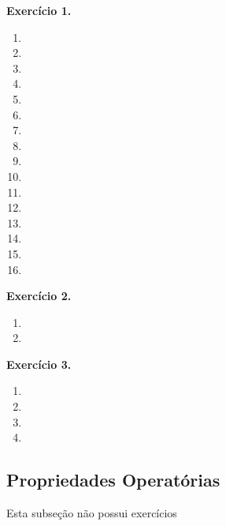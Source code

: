 \documentclass[12pt,a4paper]{article}
\begin{document}
\vspace{0.5cm}
\noindent\textbf{Exercício 1.}
\begin{enumerate}
    \renewcommand{\theenumi}{\alph{enumi}}
    \renewcommand{\labelenumi}{\theenumi)}
    \item 
    \item 
    \item 
    \item 
    \item 
    \item 
    \item 
    \item 
    \item 
    \item 
    \item 
    \item 
    \item 
    \item 
    \item 
    \item 
\end{enumerate}

\vspace{0.5cm}
\noindent\textbf{Exercício 2.}
\begin{enumerate}
    \renewcommand{\theenumi}{\alph{enumi}}
    \renewcommand{\labelenumi}{\theenumi)}
    \item 
    \item 
\end{enumerate}

\vspace{0.5cm}
\noindent\textbf{Exercício 3.}
\begin{enumerate}
    \renewcommand{\theenumi}{\alph{enumi}}
    \renewcommand{\labelenumi}{\theenumi)}
    \item 
    \item 
    \item 
    \item 
\end{enumerate}

\subsection{Propriedades Operatórias}
Esta subseção não possui exercícios
\end{document}

